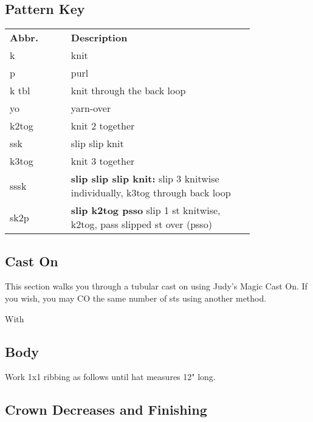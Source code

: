 \documentclass[12pt]{article}
\renewcommand{\arraystretch}{2} %
\begin{document}
\begin{titlingpage}
\begin{multicols}{2}

\vfill
\columnbreak

\subsection*{Pattern Key}

\begin{center}
{\renewcommand{\arraystretch}{1.5}
\begin{tabular}{| C{0.2\linewidth}  p{0.6\linewidth} | }
\thickhline {} 
\textbf{Abbr.}	& \textbf{Description} \\ \thickhline
k	&  knit \\
p	& purl   \\
k tbl	& knit through the back loop \\
yo		& yarn-over  \\
k2tog 	& knit 2 together \\
ssk		& slip slip knit \\
k3tog 	& knit 3 together \\
sssk		& \textbf{slip slip slip knit:} slip 3 knitwise individually, k3tog through back loop\\
sk2p	& \textbf{slip k2tog psso} slip 1 st knitwise, k2tog, pass slipped st over (psso)\\
\hline
\end{tabular}
}
\end{center}
\end{multicols}
\end{titlingpage}


\subsection*{Cast On}

This section walks you through a tubular cast on using Judy's Magic Cast On. If you wish, you may CO the same number of sts using another method.

With 

\subsection*{Body}

Work 1x1 ribbing as follows until hat measures 12" long.

\subsection*{Crown Decreases and Finishing}

\end{document}
